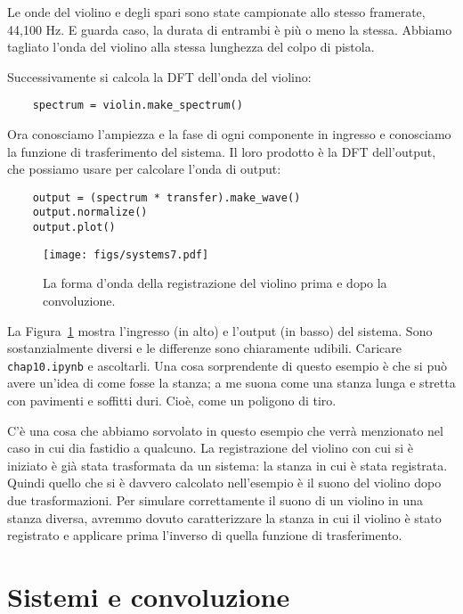 \documentclass[12pt]{book} \usepackage[width=5.5in,height=8.5in, hmarginratio=3:2,vmarginratio=1:1]{geometry}
\begin{document}
Le onde del violino e degli spari sono state campionate allo stesso framerate, 44,100 Hz. E guarda caso, la durata di entrambi è più o meno la stessa. Abbiamo tagliato l'onda del violino alla stessa lunghezza del colpo di pistola.

Successivamente si calcola la DFT dell'onda del violino:

\begin{verbatim} 
    spectrum = violin.make_spectrum()
 \end{verbatim} 

Ora conosciamo l'ampiezza e la fase di ogni componente in ingresso e conosciamo la funzione di trasferimento del sistema. Il loro prodotto è la DFT dell'output, che possiamo usare per calcolare l'onda di output:

\begin{verbatim} 
    output = (spectrum * transfer).make_wave()
    output.normalize()
    output.plot()
 \end{verbatim} 

\begin{figure} 

\centerline{\texttt{[image: figs/systems7.pdf]}} \caption{La forma d'onda della registrazione del violino prima e dopo la convoluzione.} \label{fig.systems7} \end{figure} 

La Figura~\ref{fig.systems7} mostra l'ingresso (in alto) e l'output (in basso) del sistema. Sono sostanzialmente diversi e le differenze sono chiaramente udibili. Caricare {\tt chap10.ipynb} e ascoltarli. Una cosa sorprendente di questo esempio è che si può avere un'idea di come fosse la stanza; a me suona come una stanza lunga e stretta con pavimenti e soffitti duri. Cioè, come un poligono di tiro.

C'è una cosa che abbiamo sorvolato in questo esempio che verrà menzionato nel caso in cui dia fastidio a qualcuno. La registrazione del violino con cui si è iniziato è già stata trasformata da un sistema: la stanza in cui è stata registrata. Quindi quello che si è davvero calcolato nell'esempio è il suono del violino dopo due trasformazioni. Per simulare correttamente il suono di un violino in una stanza diversa, avremmo dovuto caratterizzare la stanza in cui il violino è stato registrato e applicare prima l'inverso di quella funzione di trasferimento.

\section{Sistemi e convoluzione} \label{sysconv} 
\end{document}
